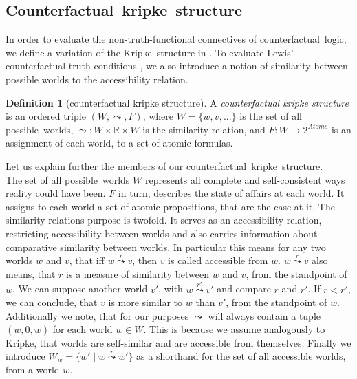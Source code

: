 \documentclass[a4paper,american]{paper}
\theoremstyle{definition}\newtheorem{definition}{Definition}
\begin{document}
\subsection{Counterfactual~kripke~structure}
In order to evaluate the non-truth-functional connectives of counterfactual~logic, we define a variation of the Kripke~structure in \cite{kripke_modal_logic_1963}. To evaluate Lewis' counterfactual truth conditions \cite{lewis_counterfactuals_1973}, we also introduce a notion of similarity between possible worlds to the accessibility relation.
\begin{definition}[counterfactual kripke structure]
A {\it counterfactual kripke structure} is an ordered triple $(W, \leadsto ,F)$, where $W=\{w,v,...\}$ is the set of all possible~worlds, $\leadsto \colon W\times \mathbb{R} \times W$ is the similarity relation, and $F \colon W \rightarrow 2^{Atoms}$ is an assignment of each world, to a set of atomic formulas.
\end{definition}
\noindent Let us explain further the members of our counterfactual~kripke~structure.\\
The set of all possible~worlds $W$ represents all complete and self-consistent ways reality could have been. $F$ in turn, describes the state of affairs at each world. It assigns to each world a set of atomic propositions, that are the case at it. The similarity relations purpose is twofold. It serves as an accessibility relation, restricting accessibility between worlds and also carries information about comparative similarity between worlds. In particular this means for any two worlds $w$ and $v$, that iff $w\overset{r}{\leadsto} v$, then $v$ is called accessible from $w$. $w\overset{r}{\leadsto} v$ also means, that $r$ is a measure of similarity between $w$ and $v$, from the standpoint of $w$. We can suppose another world $v'$, with $w\overset{r'}{\leadsto} v'$ and compare $r$ and $r'$. If $r < r'$, we can conclude, that $v$ is more similar to $w$ than $v'$, from the standpoint of $w$. Additionally we note, that for our purposes $\leadsto$ will always contain a tuple $(w, 0, w)$ for each world $w\in W$. This is because we assume analogously to Kripke, that worlds are self-similar and are accessible from themselves. Finally we introduce $W_w = \{w'\mid w \overset{r}{\leadsto} w'\}$ as a shorthand for the set of all accessible worlds, from a world $w$.
\end{document}
